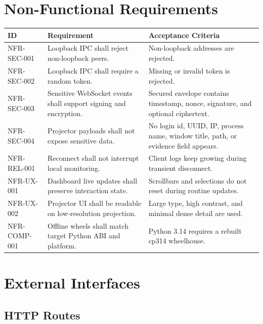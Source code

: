 \documentclass[12pt,a4paper]{article}
\begin{document}
\section{Non-Functional Requirements}

\begin{longtable}{L{0.18\textwidth} L{0.50\textwidth} L{0.22\textwidth}}
\textbf{ID} & \textbf{Requirement} & \textbf{Acceptance Criteria} \\
\hline
NFR-SEC-001 & Loopback IPC shall reject non-loopback peers. & Non-loopback addresses are rejected. \\
NFR-SEC-002 & Loopback IPC shall require a random token. & Missing or invalid token is rejected. \\
NFR-SEC-003 & Sensitive WebSocket events shall support signing and encryption. & Secured envelope contains timestamp, nonce, signature, and optional ciphertext. \\
NFR-SEC-004 & Projector payloads shall not expose sensitive data. & No login id, UUID, IP, process name, window title, path, or evidence field appears. \\
NFR-REL-001 & Reconnect shall not interrupt local monitoring. & Client logs keep growing during transient disconnect. \\
NFR-UX-001 & Dashboard live updates shall preserve interaction state. & Scrollbars and selections do not reset during routine updates. \\
NFR-UX-002 & Projector UI shall be readable on low-resolution projection. & Large type, high contrast, and minimal dense detail are used. \\
NFR-COMP-001 & Offline wheels shall match target Python ABI and platform. & Python 3.14 requires a rebuilt cp314 wheelhouse. \\
\end{longtable}

\section{External Interfaces}

\subsection{HTTP Routes}
\end{document}
